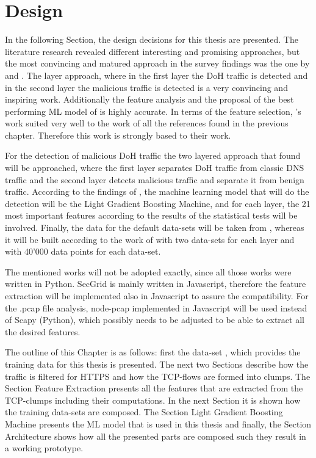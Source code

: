 \chapter{Design} \label{design}
In the following Section, the design decisions for this thesis are presented. The literature research revealed different interesting and promising approaches, but the most convincing and matured approach in the survey findings was the one by \cite{Banadaki_DetectingMalicousDoHTrafficinDNSUsingML} and \cite{BehnkeEtAl_FeatureEngineeringMLModelMaliciusDoHTraffic}. The layer approach, where in the first layer the DoH traffic is detected and in the second layer the malicious traffic is detected is a very convincing and inspiring work. Additionally the feature analysis and the proposal of the best performing ML model of \cite{BehnkeEtAl_FeatureEngineeringMLModelMaliciusDoHTraffic} is highly accurate. In terms of the feature selection, \cite{BehnkeEtAl_FeatureEngineeringMLModelMaliciusDoHTraffic}'s work suited very well to the work of all the references found in the previous chapter. Therefore this work is strongly based to their work.

For the detection of malicious DoH traffic the two layered approach that \cite{Banadaki_DetectingMalicousDoHTrafficinDNSUsingML} found will be approached, where the first layer separates DoH traffic from classic DNS traffic and the second layer detects malicious traffic and separate it from benign traffic. According to the findings of \cite{BehnkeEtAl_FeatureEngineeringMLModelMaliciusDoHTraffic}, the machine learning model that will do the detection will be the Light Gradient Boosting Machine, and for each layer, the 21 most important features according to the results of the statistical tests will be involved. Finally, the data for the default data-sets will be taken from \cite{montazerishatoori2020anomaly}, whereas it will be built according to the work of \cite{Banadaki_DetectingMalicousDoHTrafficinDNSUsingML} with two data-sets for each layer and with 40'000 data points for each data-set. 

The mentioned works will not be adopted exactly, since all those works were written in Python. SecGrid is mainly written in Javascript, therefore the feature extraction will be implemented also in Javascript to assure the compatibility. For the .pcap file analysis, node-pcap implemented in Javascript will be used instead of Scapy (Python), which possibly needs to be adjusted to be able to extract all the desired features.

The outline of this Chapter is as follows: first the data-set \cite{CIRA-CIC-DoHBrw-2020}, which provides the training data for this thesis is presented. The next two Sections describe how the traffic is filtered for HTTPS and how the TCP-flows are formed into clumps. The Section Feature Extraction presents all the features that are extracted from the TCP-clumps including their computations. In the next Section it is shown how the training data-sets are composed. The Section Light Gradient Boosting Machine presents the ML model that is used in this thesis and finally, the Section Architecture shows how all the presented parts are composed such they result in a working prototype. 

